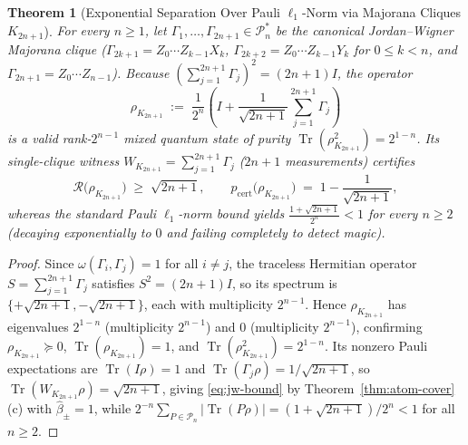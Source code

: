 \documentclass[11pt,a4paper]{article}
\newtheorem{theorem}{Theorem}[section]
\theoremstyle{definition}
\theoremstyle{remark}
\newcommand{\RoM}{\mathcal{R}}
\newcommand{\Pauli}{\mathcal{P}}
\newcommand{\Tr}{\operatorname{Tr}}
\begin{document}
\begin{theorem}[Exponential Separation Over Pauli $\ell_1$-Norm via Majorana Cliques $K_{2n+1}$]
\label{thm:majorana}
For every $n \ge 1$, let $\Gamma_1, \dots, \Gamma_{2n+1} \in \Pauli_n^*$ be the canonical Jordan--Wigner Majorana clique ($\Gamma_{2k+1} = Z_0\cdots Z_{k-1}X_k$, $\Gamma_{2k+2} = Z_0\cdots Z_{k-1}Y_k$ for $0 \le k < n$, and $\Gamma_{2n+1} = Z_0\cdots Z_{n-1}$). Because $(\sum_{j=1}^{2n+1} \Gamma_j)^2 = (2n+1)I$, the operator
\begin{equation}
  \rho_{K_{2n+1}} \;:=\; \frac{1}{2^n}\!\left(I + \frac{1}{\sqrt{2n+1}} \sum_{j=1}^{2n+1} \Gamma_j\right)
  \label{eq:rho-jw}
\end{equation}
is a valid rank-$2^{n-1}$ mixed quantum state of purity $\Tr(\rho_{K_{2n+1}}^2) = 2^{1-n}$. Its single-clique witness $W_{K_{2n+1}} = \sum_{j=1}^{2n+1} \Gamma_j$ ($2n+1$ measurements) certifies
\begin{equation}
  \RoM\bigl(\rho_{K_{2n+1}}\bigr) \;\ge\; \sqrt{2n+1}, \qquad p_{\mathrm{cert}}\bigl(\rho_{K_{2n+1}}\bigr) \;=\; 1 - \frac{1}{\sqrt{2n+1}},
  \label{eq:jw-bound}
\end{equation}
whereas the standard Pauli $\ell_1$-norm bound yields $\frac{1 + \sqrt{2n+1}}{2^n} < 1$ for every $n \ge 2$ (decaying exponentially to $0$ and failing completely to detect magic).
\end{theorem}
\begin{proof}
Since $\omega(\Gamma_i, \Gamma_j) = 1$ for all $i \neq j$, the traceless Hermitian operator $S = \sum_{j=1}^{2n+1} \Gamma_j$ satisfies $S^2 = (2n+1)I$, so its spectrum is $\{+\sqrt{2n+1}, -\sqrt{2n+1}\}$, each with multiplicity $2^{n-1}$. Hence $\rho_{K_{2n+1}}$ has eigenvalues $2^{1-n}$ (multiplicity $2^{n-1}$) and $0$ (multiplicity $2^{n-1}$), confirming $\rho_{K_{2n+1}} \succeq 0$, $\Tr(\rho_{K_{2n+1}}) = 1$, and $\Tr(\rho_{K_{2n+1}}^2) = 2^{1-n}$. Its nonzero Pauli expectations are $\Tr(I\rho) = 1$ and $\Tr(\Gamma_j \rho) = 1/\sqrt{2n+1}$, so $\Tr(W_{K_{2n+1}} \rho) = \sqrt{2n+1}$, giving \eqref{eq:jw-bound} by Theorem~\ref{thm:atom-cover}(c) with $\hat{\beta}_\pm = 1$, while $2^{-n}\sum_{P \in \Pauli_n}|\Tr(P\rho)| = (1 + \sqrt{2n+1})/2^n < 1$ for all $n \ge 2$.
\end{proof}
\end{document}
